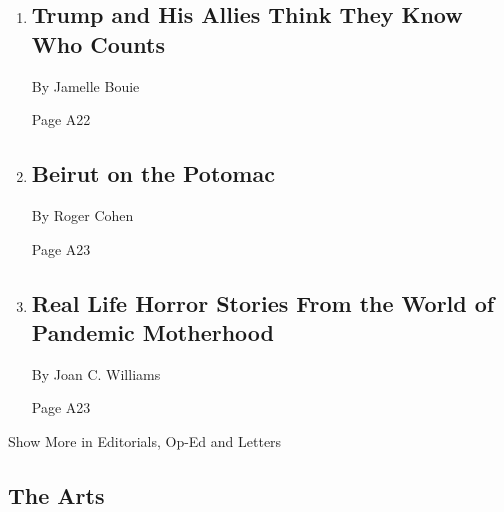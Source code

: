 \begin{enumerate}
\def\labelenumi{\arabic{enumi}.}
\item
  \href{/2020/08/07/opinion/trump-2020-census.html}{}

  \hypertarget{trump-and-his-allies-think-they-know-who-counts}{%
  \subsection{Trump and His Allies Think They Know Who
  Counts}\label{trump-and-his-allies-think-they-know-who-counts}}

  By Jamelle Bouie

  Page A22
\item
  \href{/2020/08/07/opinion/beirut-explosion.html}{}

  \hypertarget{beirut-on-the-potomac}{%
  \subsection{Beirut on the Potomac}\label{beirut-on-the-potomac}}

  By Roger Cohen

  Page A23
\item
  \href{/2020/08/06/opinion/mothers-discrimination-coronavirus.html}{}

  \hypertarget{real-life-horror-stories-from-the-world-of-pandemic-motherhood}{%
  \subsection{Real Life Horror Stories From the World of Pandemic
  Motherhood}\label{real-life-horror-stories-from-the-world-of-pandemic-motherhood}}

  By Joan C. Williams

  Page A23
\end{enumerate}

Show More in Editorials, Op-Ed and Letters

\hypertarget{the-arts}{%
\subsection{The Arts}\label{the-arts}}

